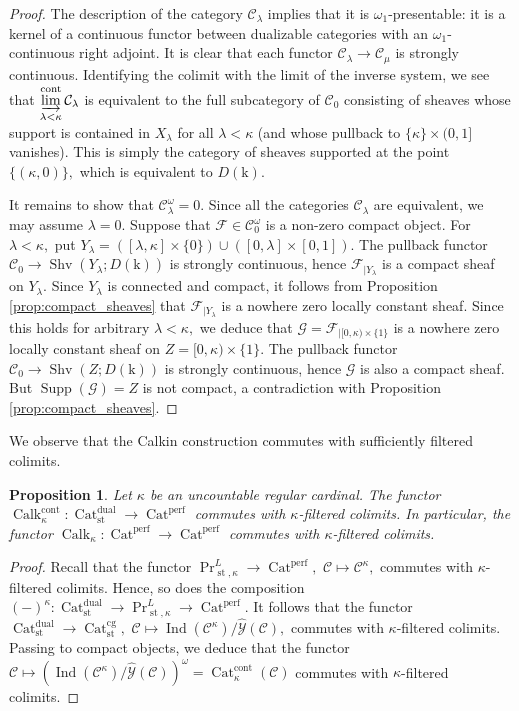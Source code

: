 \documentclass[11pt,leqno]{amsart}
\newtheorem{prop}[theo]{Proposition}
\numberwithin{equation}{section}
\newcommand{\indlim}[1][]{\mathop{\varinjlim}\limits_{#1}}
\newcommand{\Cat}{\operatorname{Cat}}
\newcommand{\cont}{\operatorname{cont}}
\newcommand{\st}{\operatorname{st}}
\newcommand{\cg}{\operatorname{cg}}
\newcommand{\dual}{\operatorname{dual}}
\newcommand{\mk}{\mathrm k}
\newcommand{\cF}{{\mathcal F}}
\newcommand{\cG}{{\mathcal G}}
\newcommand{\cC}{{\mathcal C}}
\newcommand{\cY}{{\mathcal Y}}
\newcommand{\perf}{\operatorname{perf}}
\newcommand{\Shv}{\operatorname{Shv}}
\newcommand{\supp}{\operatorname{Supp}}
\newcommand{\Ind}{\operatorname{Ind}}
\newcommand{\Calk}{\operatorname{Calk}}
\begin{document}
\begin{proof} The description of the category $\cC_{\lambda}$ implies that it is $\omega_1$-presentable: it is a kernel of a continuous functor between dualizable categories with an $\omega_1$-continuous right adjoint.
It is clear that each functor $\cC_{\lambda}\to\cC_{\mu}$ is strongly continuous. Identifying the colimit with the limit of the inverse system, we see that $\indlim[\lambda<\kappa]^{\cont}\cC_{\lambda}$ is equivalent to the full subcategory of $\cC_0$ consisting of sheaves whose support is contained in $X_{\lambda}$ for all $\lambda<\kappa$ (and whose pullback to $\{\kappa\}\times (0,1]$ vanishes). This is simply the category of sheaves supported at the point $\{(\kappa,0)\},$ which is equivalent to $D(\mk).$

It remains to show that $\cC_{\lambda}^{\omega}=0.$ Since all the categories $\cC_{\lambda}$ are equivalent, we may assume $\lambda=0.$ Suppose that $\cF\in\cC_0^{\omega}$ is a non-zero compact object. For $\lambda<\kappa,$ put 
$Y_{\lambda}=([\lambda,\kappa]\times\{0\})\cup ([0,\lambda]\times [0,1]).$ 
The pullback functor $\cC_0\to\Shv(Y_{\lambda};D(\mk))$ is strongly continuous, hence $\cF_{\mid Y_{\lambda}}$ is a compact sheaf on $Y_{\lambda}.$ Since $Y_{\lambda}$ is connected and compact, it follows from Proposition \ref{prop:compact_sheaves} that $\cF_{\mid Y_{\lambda}}$ is a nowhere zero locally constant sheaf. Since this holds for arbitrary $\lambda<\kappa,$ we deduce that $\cG=\cF_{\mid [0,\kappa)\times\{1\}}$ is a nowhere zero locally constant sheaf on $Z=[0,\kappa)\times\{1\}$. The pullback functor $\cC_0\to\Shv(Z; D(\mk))$ is strongly continuous, hence $\cG$ is also a compact sheaf. But $\supp(\cG)=Z$ is not compact, a contradiction with Proposition \ref{prop:compact_sheaves}.
\end{proof}

We observe that the Calkin construction commutes with sufficiently filtered colimits.

\begin{prop}\label{prop:Calkin_construction_accessible} Let $\kappa$ be an uncountable regular cardinal. The functor $\Calk_{\kappa}^{\cont}:\Cat_{\st}^{\dual}\to\Cat^{\perf}$ commutes with $\kappa$-filtered colimits. In particular, the functor $\Calk_{\kappa}:\Cat^{\perf}\to \Cat^{\perf}$ commutes with $\kappa$-filtered colimits.\end{prop}

\begin{proof}Recall that the functor $\Pr^L_{\st,\kappa}\to\Cat^{\perf},$ $\cC\mapsto\cC^{\kappa},$ commutes with $\kappa$-filtered colimits. Hence, so does the composition $(-)^{\kappa}:\Cat_{\st}^{\dual}\to \Pr^L_{\st,\kappa}\to\Cat^{\perf}.$ It follows that the functor $\Cat_{\st}^{\dual}\to\Cat_{\st}^{\cg},$ $\cC\mapsto\Ind(\cC^{\kappa})/\hat{\cY}(\cC),$ commutes with $\kappa$-filtered colimits. Passing to compact objects, we deduce that the functor $\cC\mapsto (\Ind(\cC^{\kappa})/\hat{\cY}(\cC))^{\omega}=\Cat_{\kappa}^{\cont}(\cC)$ commutes with $\kappa$-filtered colimits.\end{proof}
\end{document}
